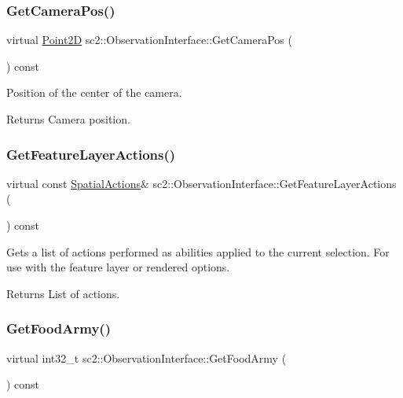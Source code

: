 \subsubsection{\texorpdfstring{Get\+Camera\+Pos()}{GetCameraPos()}}
{\footnotesize\ttfamily virtual \hyperlink{structsc2_1_1_point2_d}{Point2D} sc2\+::\+Observation\+Interface\+::\+Get\+Camera\+Pos (\begin{DoxyParamCaption}{ }\end{DoxyParamCaption}) const\hspace{0.3cm}{\ttfamily [pure virtual]}}

Position of the center of the camera. \begin{DoxyReturn}{Returns}
Camera position. 
\end{DoxyReturn}
\mbox{\label{classsc2_1_1_observation_interface_a1e0b5b6e6e6ce0a879c1854b696dcdb0}} 
\subsubsection{\texorpdfstring{Get\+Feature\+Layer\+Actions()}{GetFeatureLayerActions()}}
{\footnotesize\ttfamily virtual const \hyperlink{structsc2_1_1_spatial_actions}{Spatial\+Actions}\& sc2\+::\+Observation\+Interface\+::\+Get\+Feature\+Layer\+Actions (\begin{DoxyParamCaption}{ }\end{DoxyParamCaption}) const\hspace{0.3cm}{\ttfamily [pure virtual]}}

Gets a list of actions performed as abilities applied to the current selection. For use with the feature layer or rendered options. \begin{DoxyReturn}{Returns}
List of actions. 
\end{DoxyReturn}
\mbox{\label{classsc2_1_1_observation_interface_a7fd13a2a776f08f714d941ba9e4bafa8}} 
\subsubsection{\texorpdfstring{Get\+Food\+Army()}{GetFoodArmy()}}
{\footnotesize\ttfamily virtual int32\+\_\+t sc2\+::\+Observation\+Interface\+::\+Get\+Food\+Army (\begin{DoxyParamCaption}{ }\end{DoxyParamCaption}) const\hspace{0.3cm}{\ttfamily [pure virtual]}}

